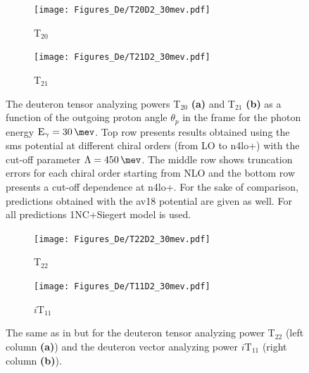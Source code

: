     \begin{figure}[htb]
        \centering
        \begin{subfigure}[b]{0.46\textwidth}
            \caption{T$_{20}$}
            \texttt{[image: Figures\_De/T20D2\_30mev.pdf]}
            \label{T20_30_vert}
        \end{subfigure}
        \begin{subfigure}[b]{0.46\textwidth}
            \caption{T$_{21}$}
            \texttt{[image: Figures\_De/T21D2\_30mev.pdf]}
            \label{T21_30_vert}
        \end{subfigure}
        \caption{The deuteron tensor analyzing powers T$_{20}$  {\bf (a)}
        and T$_{21}$ {\bf (b)}
        as a function of the outgoing proton angle $\theta_p$ in the  frame 
        for the photon energy $\text{E}_\gamma = \SI{30}{\mev}$.
        Top row presents results obtained using the \gls{sms} potential
        at different chiral orders (from LO to \gls{n4lo+}) with the cut-off parameter $\Lambda=\SI{450}{\mev}$.
        The middle row shows truncation errors for each 
        chiral order starting from NLO and
        the bottom row presents a cut-off dependence at \gls{n4lo+}.
        For the sake of comparison, predictions obtained with the \gls{av18} potential are given as well.
        For all predictions 1NC+Siegert model is used.}
        \label{T20_T21_30}
    \end{figure}

    \begin{figure}[htb]
        \centering
        \begin{subfigure}[b]{0.46\textwidth}
            \caption{T$_{22}$}
            \texttt{[image: Figures\_De/T22D2\_30mev.pdf]}
            \label{T22_30_vert}
        \end{subfigure}
        \begin{subfigure}[b]{0.46\textwidth}
            \caption{$i\text{T}_{11}$}
            \texttt{[image: Figures\_De/T11D2\_30mev.pdf]}
            \label{T11_30_vert}
        \end{subfigure}
        \caption{The same as in  but for the deuteron tensor analyzing power
        T$_{22}$ (left column {\bf (a)}) and the deuteron vector analyzing power
        $i\text{T}_{11}$ (right column  {\bf (b)}).}
        \label{T22_T11_30}
    \end{figure}


